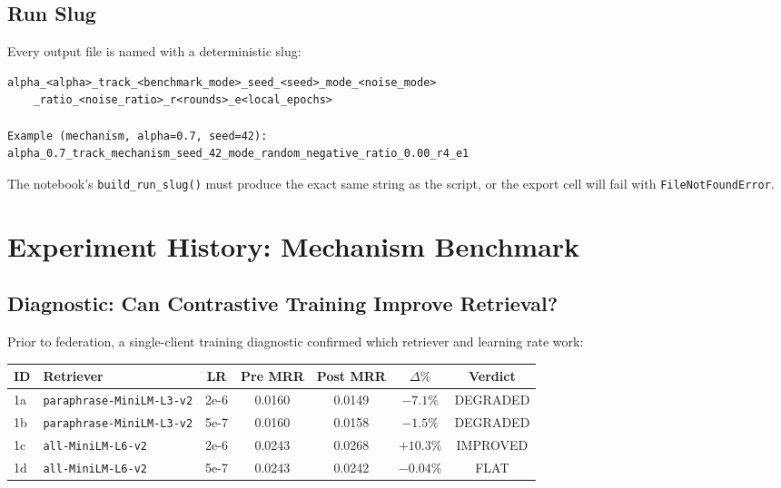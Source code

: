 \documentclass[12pt,a4paper]{article}
\begin{document}
\subsection{Run Slug}

Every output file is named with a deterministic slug:

\begin{verbatim}
alpha_<alpha>_track_<benchmark_mode>_seed_<seed>_mode_<noise_mode>
    _ratio_<noise_ratio>_r<rounds>_e<local_epochs>

Example (mechanism, alpha=0.7, seed=42):
alpha_0.7_track_mechanism_seed_42_mode_random_negative_ratio_0.00_r4_e1
\end{verbatim}

The notebook's \texttt{build\_run\_slug()} must produce the exact same string as the script, or the export cell will fail with \texttt{FileNotFoundError}.

\section{Experiment History: Mechanism Benchmark}

\subsection{Diagnostic: Can Contrastive Training Improve Retrieval?}

Prior to federation, a single-client training diagnostic confirmed which retriever and learning rate work:

\begin{center}
\renewcommand{\arraystretch}{1.4}
\begin{tabular}{llccccc}
\toprule
\textbf{ID} & \textbf{Retriever} & \textbf{LR} & \textbf{Pre MRR} & \textbf{Post MRR} & $\Delta\%$ & \textbf{Verdict} \\
\midrule
1a & \texttt{paraphrase-MiniLM-L3-v2} & 2e-6 & 0.0160 & 0.0149 & $-7.1\%$ & \textcolor{alertred}{DEGRADED} \\
1b & \texttt{paraphrase-MiniLM-L3-v2} & 5e-7 & 0.0160 & 0.0158 & $-1.5\%$ & \textcolor{alertred}{DEGRADED} \\
1c & \texttt{all-MiniLM-L6-v2} & 2e-6 & 0.0243 & 0.0268 & $+10.3\%$ & \textcolor{successgreen}{IMPROVED} \\
1d & \texttt{all-MiniLM-L6-v2} & 5e-7 & 0.0243 & 0.0242 & $-0.04\%$ & \textcolor{alertred}{FLAT} \\
\bottomrule
\end{tabular}
\end{center}
\end{document}
